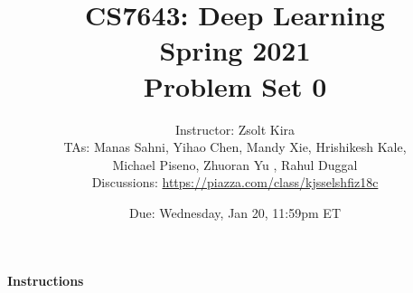 \documentclass[11pt,english, answers]{exam}
\begin{document}
\title{CS7643: Deep Learning\\
Spring 2021 \\
Problem Set 0}
\author{Instructor: Zsolt Kira \\
TAs: Manas Sahni, Yihao Chen, Mandy Xie, Hrishikesh Kale, \\Michael Piseno, Zhuoran Yu , Rahul Duggal\\
Discussions: \url{https://piazza.com/class/kjsselshfiz18c}}
\date{Due: Wednesday, Jan 20, 11:59pm ET}

\maketitle

\paragraph*{Instructions}
\end{document}
